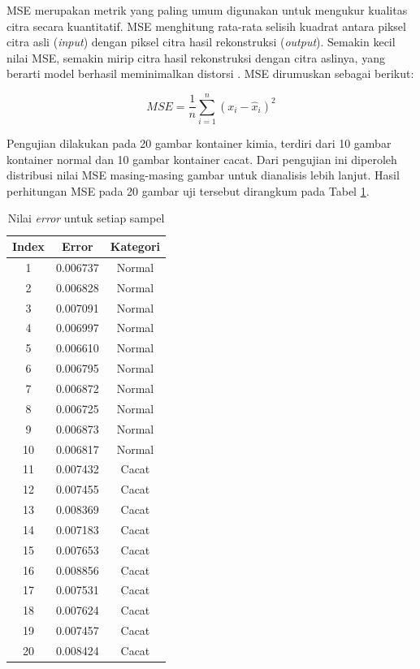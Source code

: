 MSE merupakan metrik yang paling umum digunakan untuk mengukur
kualitas citra secara kuantitatif. MSE menghitung rata-rata selisih
kuadrat antara piksel citra asli (\textit{input}) dengan piksel citra hasil
rekonstruksi (\textit{output}). Semakin kecil nilai MSE, semakin mirip citra
hasil rekonstruksi dengan citra aslinya, yang berarti model berhasil
meminimalkan distorsi \citep{27}. MSE dirumuskan sebagai berikut:

\begin{equation}
  MSE = \frac{1}{n} \sum_{i=1}^{n} (x_i - \hat{x}_i)^2
\end{equation}

Pengujian dilakukan pada 20 gambar kontainer kimia, terdiri dari 10
gambar kontainer normal dan 10 gambar kontainer cacat. Dari pengujian
ini diperoleh distribusi nilai MSE masing-masing gambar untuk
dianalisis lebih lanjut. Hasil perhitungan MSE pada 20 gambar uji
tersebut dirangkum pada Tabel \ref{tab:error-samples}.

\begin{table}[H]
  \centering
  \caption{Nilai \textit{error} untuk setiap sampel}
  \label{tab:error-samples}
  \begin{tabular}{ccc}
    \toprule
    \textbf{Index} & \textbf{Error} & \textbf{Kategori} \\
    \midrule
    1  & 0.006737 & Normal \\
    2  & 0.006828 & Normal \\
    3  & 0.007091 & Normal \\
    4  & 0.006997 & Normal \\
    5  & 0.006610 & Normal \\
    6  & 0.006795 & Normal \\
    7  & 0.006872 & Normal \\
    8  & 0.006725 & Normal \\
    9  & 0.006873 & Normal \\
    10 & 0.006817 & Normal \\
    11 & 0.007432 & Cacat \\
    12 & 0.007455 & Cacat \\
    13 & 0.008369 & Cacat \\
    14 & 0.007183 & Cacat \\
    15 & 0.007653 & Cacat \\
    16 & 0.008856 & Cacat \\
    17 & 0.007531 & Cacat \\
    18 & 0.007624 & Cacat \\
    19 & 0.007457 & Cacat \\
    20 & 0.008424 & Cacat \\
    \bottomrule
  \end{tabular}
\end{table}

